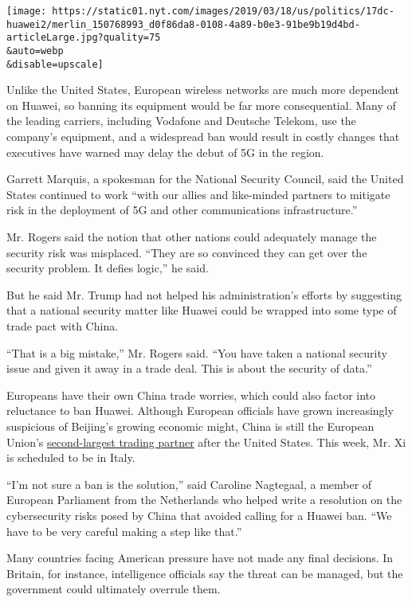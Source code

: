 \texttt{[image: https://static01.nyt.com/images/2019/03/18/us/politics/17dc-huawei2/merlin\_150768993\_d0f86da8-0108-4a89-b0e3-91be9b19d4bd-articleLarge.jpg?quality=75\\\&auto=webp\\\&disable=upscale]}

Unlike the United States, European wireless networks are much more
dependent on Huawei, so banning its equipment would be far more
consequential. Many of the leading carriers, including Vodafone and
Deutsche Telekom, use the company's equipment, and a widespread ban
would result in costly changes that executives have warned may delay the
debut of 5G in the region.

Garrett Marquis, a spokesman for the National Security Council, said the
United States continued to work ``with our allies and like-minded
partners to mitigate risk in the deployment of 5G and other
communications infrastructure.''

Mr. Rogers said the notion that other nations could adequately manage
the security risk was misplaced. ``They are so convinced they can get
over the security problem. It defies logic,'' he said.

But he said Mr. Trump had not helped his administration's efforts by
suggesting that a national security matter like Huawei could be wrapped
into some type of trade pact with China.

``That is a big mistake,'' Mr. Rogers said. ``You have taken a national
security issue and given it away in a trade deal. This is about the
security of data.''

Europeans have their own China trade worries, which could also factor
into reluctance to ban Huawei. Although European officials have grown
increasingly suspicious of Beijing's growing economic might, China is
still the European Union's
\href{http://ec.europa.eu/trade/policy/countries-and-regions/countries/china/index_en.htm}{second-largest
trading partner} after the United States. This week, Mr. Xi is scheduled
to be in Italy.

``I'm not sure a ban is the solution,'' said Caroline Nagtegaal, a
member of European Parliament from the Netherlands who helped write a
resolution on the cybersecurity risks posed by China that avoided
calling for a Huawei ban. ``We have to be very careful making a step
like that.''

Many countries facing American pressure have not made any final
decisions. In Britain, for instance, intelligence officials say the
threat can be managed, but the government could ultimately overrule
them.

